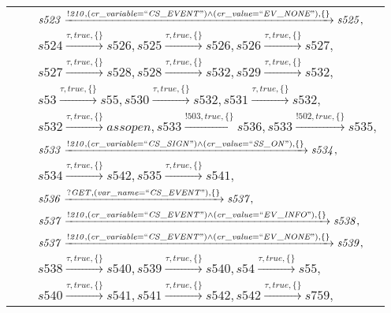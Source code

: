\begin{tabular}{lcp{350px}}
& & $\mathit{s523}\xrightarrow{\mathit{!210}, \mathit{(cr\_variable = ``CS\_EVENT") \land (cr\_value = ``EV\_NONE")}, \{\}}\mathit{s525},$ \\
& & $\mathit{s524}\xrightarrow{\mathit{\tau}, \mathit{true}, \{\}}\mathit{s526},\mathit{s525}\xrightarrow{\mathit{\tau}, \mathit{true}, \{\}}\mathit{s526},\mathit{s526}\xrightarrow{\mathit{\tau}, \mathit{true}, \{\}}\mathit{s527},$ \\
& & $\mathit{s527}\xrightarrow{\mathit{\tau}, \mathit{true}, \{\}}\mathit{s528},\mathit{s528}\xrightarrow{\mathit{\tau}, \mathit{true}, \{\}}\mathit{s532},\mathit{s529}\xrightarrow{\mathit{\tau}, \mathit{true}, \{\}}\mathit{s532},$ \\
& & $\mathit{s53}\xrightarrow{\mathit{\tau}, \mathit{true}, \{\}}\mathit{s55},\mathit{s530}\xrightarrow{\mathit{\tau}, \mathit{true}, \{\}}\mathit{s532},\mathit{s531}\xrightarrow{\mathit{\tau}, \mathit{true}, \{\}}\mathit{s532},$ \\
& & $\mathit{s532}\xrightarrow{\mathit{\tau}, \mathit{true}, \{\}}\mathit{assopen},\mathit{s533}\xrightarrow{\mathit{!503}, \mathit{true}, \{\}}\mathit{s536},\mathit{s533}\xrightarrow{\mathit{!502}, \mathit{true}, \{\}}\mathit{s535},$ \\
& & $\mathit{s533}\xrightarrow{\mathit{!210}, \mathit{(cr\_variable = ``CS\_SIGN") \land (cr\_value = ``SS\_ON")}, \{\}}\mathit{s534},$ \\
& & $\mathit{s534}\xrightarrow{\mathit{\tau}, \mathit{true}, \{\}}\mathit{s542},\mathit{s535}\xrightarrow{\mathit{\tau}, \mathit{true}, \{\}}\mathit{s541},$ \\
& & $\mathit{s536}\xrightarrow{\mathit{?GET}, \mathit{(var\_name = ``CS\_EVENT")}, \{\}}\mathit{s537},$ \\
& & $\mathit{s537}\xrightarrow{\mathit{!210}, \mathit{(cr\_variable = ``CS\_EVENT") \land (cr\_value = ``EV\_INFO")}, \{\}}\mathit{s538},$ \\
& & $\mathit{s537}\xrightarrow{\mathit{!210}, \mathit{(cr\_variable = ``CS\_EVENT") \land (cr\_value = ``EV\_NONE")}, \{\}}\mathit{s539},$ \\
& & $\mathit{s538}\xrightarrow{\mathit{\tau}, \mathit{true}, \{\}}\mathit{s540},\mathit{s539}\xrightarrow{\mathit{\tau}, \mathit{true}, \{\}}\mathit{s540},\mathit{s54}\xrightarrow{\mathit{\tau}, \mathit{true}, \{\}}\mathit{s55},$ \\
& & $\mathit{s540}\xrightarrow{\mathit{\tau}, \mathit{true}, \{\}}\mathit{s541},\mathit{s541}\xrightarrow{\mathit{\tau}, \mathit{true}, \{\}}\mathit{s542},\mathit{s542}\xrightarrow{\mathit{\tau}, \mathit{true}, \{\}}\mathit{s759},$ \\

\end{tabular}
